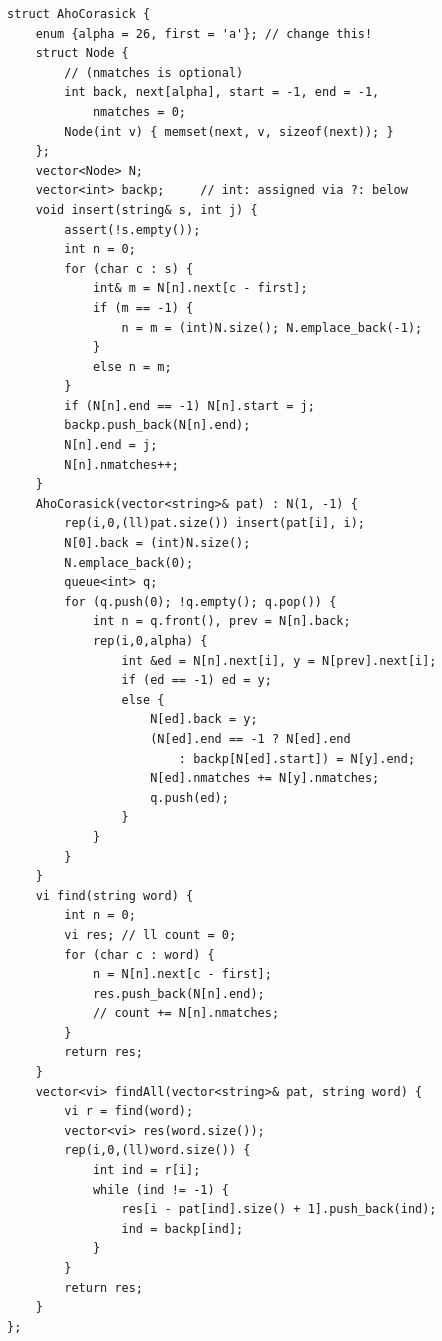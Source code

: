 \begin{lstlisting}
struct AhoCorasick {
    enum {alpha = 26, first = 'a'}; // change this!
    struct Node {
        // (nmatches is optional)
        int back, next[alpha], start = -1, end = -1,
            nmatches = 0;
        Node(int v) { memset(next, v, sizeof(next)); }
    };
    vector<Node> N;
    vector<int> backp;     // int: assigned via ?: below
    void insert(string& s, int j) {
        assert(!s.empty());
        int n = 0;
        for (char c : s) {
            int& m = N[n].next[c - first];
            if (m == -1) {
                n = m = (int)N.size(); N.emplace_back(-1);
            }
            else n = m;
        }
        if (N[n].end == -1) N[n].start = j;
        backp.push_back(N[n].end);
        N[n].end = j;
        N[n].nmatches++;
    }
    AhoCorasick(vector<string>& pat) : N(1, -1) {
        rep(i,0,(ll)pat.size()) insert(pat[i], i);
        N[0].back = (int)N.size();
        N.emplace_back(0);
        queue<int> q;
        for (q.push(0); !q.empty(); q.pop()) {
            int n = q.front(), prev = N[n].back;
            rep(i,0,alpha) {
                int &ed = N[n].next[i], y = N[prev].next[i];
                if (ed == -1) ed = y;
                else {
                    N[ed].back = y;
                    (N[ed].end == -1 ? N[ed].end
                        : backp[N[ed].start]) = N[y].end;
                    N[ed].nmatches += N[y].nmatches;
                    q.push(ed);
                }
            }
        }
    }
    vi find(string word) {
        int n = 0;
        vi res; // ll count = 0;
        for (char c : word) {
            n = N[n].next[c - first];
            res.push_back(N[n].end);
            // count += N[n].nmatches;
        }
        return res;
    }
    vector<vi> findAll(vector<string>& pat, string word) {
        vi r = find(word);
        vector<vi> res(word.size());
        rep(i,0,(ll)word.size()) {
            int ind = r[i];
            while (ind != -1) {
                res[i - pat[ind].size() + 1].push_back(ind);
                ind = backp[ind];
            }
        }
        return res;
    }
};
\end{lstlisting}


